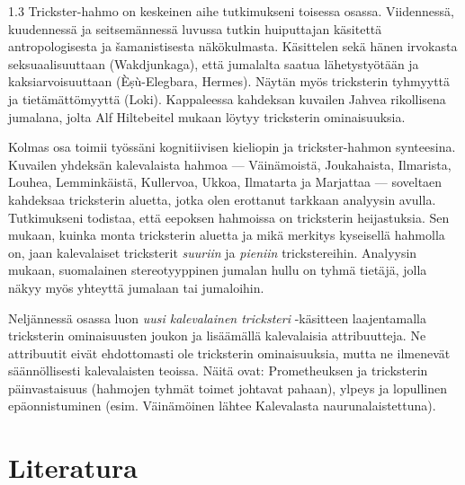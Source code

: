 \documentclass[11pt,a4paper,twoside]{report}
\makeatletter
\newcommand{\ChapterOutsidePart}{%
   \def\toclevel@chapter{-1}\def\toclevel@section{0}\def\toclevel@subsection{1}}
\makeatother
\begin{document}
\begin{spacing}{1.3}
Trickster-hahmo on keskeinen aihe tutkimukseni toisessa osassa. Viidennessä, kuudennessä ja seitsemännessä luvussa tutkin huiputtajan käsitettä antropologisesta ja šamanistisesta näkökulmasta. Käsittelen sekä hänen irvokasta seksuaalisuuttaan (Wak\-djunkaga), että jumalalta saatua lähetystyötään ja kaksiarvoisuuttaan (\`{E}\d{s}\`{u}-Elegbara, Hermes). Näytän myös tricksterin tyhmyyttä ja tietämättömyyttä (Loki). Kappaleessa kahdeksan kuvailen Jahvea rikollisena jumalana, jolta Alf Hiltebeitel mukaan löytyy tricksterin ominaisuuksia.

Kolmas osa toimii työssäni kognitiivisen kieliopin ja trickster-hahmon synteesina. Kuvailen yhdeksän kalevalaista hahmoa --- Väinämoistä, Joukahaista, Ilmarista, Louhea, Lemminkäistä, Kullervoa, Ukkoa, Ilmatarta ja Marjattaa --- soveltaen kahdeksaa tricksterin aluetta, jotka olen erottanut tarkkaan analyysin avulla. Tutkimukseni todistaa, että eepoksen hahmoissa on tricksterin heijastuksia. Sen mukaan, kuinka monta tricksterin aluetta ja mikä merkitys kyseisellä hahmolla on, jaan kalevalaiset tricksterit \emph{suuriin} ja \emph{pieniin} trickstereihin. Analyysin mukaan, suomalainen stereotyyppinen jumalan hullu on tyhmä tietäjä, jolla näkyy myös yhteyttä jumalaan tai jumaloihin.

Neljännessä osassa luon \emph{uusi kalevalainen tricksteri} -käsitteen laajentamalla tricksterin ominaisuusten joukon ja lisäämällä kalevalaisia attribuutteja. Ne attribuutit eivät ehdottomasti ole tricksterin ominaisuuksia, mutta ne ilmenevät säännöllisesti kalevalaisten teoissa. Näitä ovat: Prometheuksen ja tricksterin päinvastaisuus (hahmojen tyhmät toimet johtavat pahaan), ylpeys ja lopullinen epäonnistuminen (esim. Väinämöinen lähtee Kalevalasta naurunalaistettuna).

\end{spacing}

\ChapterOutsidePart
\chapter*{Literatura}
\end{document}
